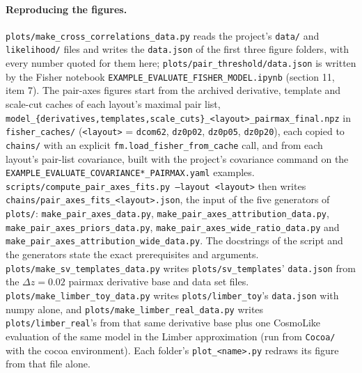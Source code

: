 \documentclass[11pt]{article}
\newcommand{\us}{\_\allowbreak}
\begin{document}
\paragraph{Reproducing the figures.}
\texttt{plots/make\us cross\us correlations\us data.py} reads the
project's \texttt{data/} and \texttt{likelihood/} files and writes the
\texttt{data.json} of the first three figure folders, with every
number quoted for them here;
\texttt{plots/pair\us threshold/data.json} is written by the Fisher
notebook \texttt{EXAMPLE\us EVALUATE\us FISHER\us MODEL.ipynb}
(section 11, item 7).  The pair-axes figures start from the archived
derivative, template and scale-cut caches of each layout's maximal
pair list,
\texttt{model\us \{derivatives,templates,scale\us cuts\}\us <layout>\us pairmax\us final.npz}
in \texttt{fisher\us caches/} (\texttt{<layout>} = \texttt{dcom62},
\texttt{dz0p02}, \texttt{dz0p05}, \texttt{dz0p20}), each copied to
\texttt{chains/} with an explicit
\texttt{fm.load\us fisher\us from\us cache} call, and from each
layout's pair-list covariance, built with the project's covariance
command on the
\texttt{EXAMPLE\us EVALUATE\us COVARIANCE*\us PAIRMAX.yaml}
examples.
\texttt{scripts/compute\us pair\us axes\us fits.py --layout <layout>}
then writes \texttt{chains/pair\us axes\us fits\us <layout>.json},
the input of the five generators of \texttt{plots/}:
\texttt{make\us pair\us axes\us data.py},
\texttt{make\us pair\us axes\us attribution\us data.py},
\texttt{make\us pair\us axes\us priors\us data.py},
\texttt{make\us pair\us axes\us wide\us ratio\us data.py} and
\texttt{make\us pair\us axes\us attribution\us wide\us data.py}.
The docstrings of the script and the generators state the exact
prerequisites and arguments.
\texttt{plots/make\us sv\us templates\us data.py} writes
\texttt{plots/sv\us templates}' \texttt{data.json} from the
$\Delta z = 0.02$ pairmax derivative base and data set files.
\texttt{plots/make\us limber\us toy\us data.py} writes
\texttt{plots/limber\us toy}'s \texttt{data.json} with numpy alone,
and \texttt{plots/make\us limber\us real\us data.py} writes
\texttt{plots/limber\us real}'s from that same derivative base plus
one CosmoLike evaluation of the same model in the Limber
approximation (run from \texttt{Cocoa/} with the cocoa environment).
Each folder's \texttt{plot\us <name>.py} redraws its figure from that
file alone.
\end{document}
